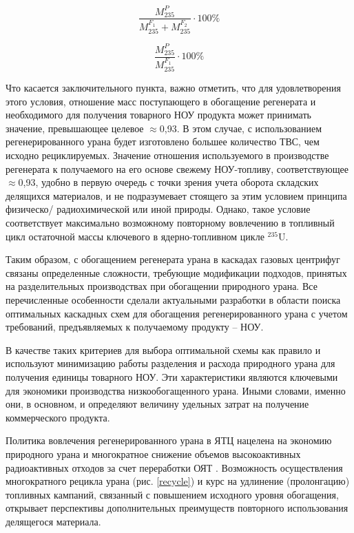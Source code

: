 \begin{equation}
  \label{Rec_rel}
  \frac{M_{235}^{P}}{M_{235}^{F_{1}}+M_{235}^{F_{2}}} \cdot 100 \%
\end{equation}

\begin{equation}
  \label{RecR_rel}
  \frac{M_{235}^{P}}{M_{235}^{F_{1}}} \cdot 100 \%
\end{equation}

Что касается заключительного пункта, важно отметить, что для удовлетворения этого условия, отношение масс поступающего в обогащение регенерата и необходимого для получения товарного НОУ продукта может принимать значение, превышающее целевое $\approx$0,93. В этом случае, с использованием регенерированного урана будет изготовлено большее количество ТВС, чем исходно рециклируемых. Значение отношения используемого в производстве регенерата к получаемого на его основе свежему НОУ-топливу, соответствующее $\approx$0,93, удобно в первую очередь с точки зрения учета оборота складских делящихся материалов, и не подразумевает стоящего за этим условием принципа физическо/ радиохимической или иной природы.  Однако, такое условие соответствует максимально возможному повторному вовлечению в топливный цикл остаточной массы ключевого в ядерно-топливном цикле $^{235}$U.

Таким образом, с обогащением регенерата урана в каскадах газовых центрифуг связаны определенные сложности, требующие модификации подходов, принятых на разделительных производствах при обогащении природного урана. Все перечисленные особенности сделали актуальными разработки в области поиска оптимальных каскадных схем для обогащения регенерированного урана с учетом требований, предъявляемых к получаемому продукту -- НОУ. 

В качестве таких критериев для выбора оптимальной схемы как правило и используют минимизацию работы разделения и расхода природного урана для получения единицы товарного НОУ. Эти характеристики являются ключевыми для экономики производства низкообогащенного урана. Иными словами, именно они, в основном, и определяют величину удельных затрат на получение коммерческого продукта.

Политика вовлечения регенерированного урана в ЯТЦ нацелена на экономию природного урана и многократное снижение объемов высокоактивных радиоактивных отходов за счет переработки ОЯТ \cite{delculAnalysisReuseUranium2009}. Возможность осуществления многократного рецикла урана (рис. \ref{recycle}) и курс на удлинение (пролонгацию) топливных кампаний, связанный с повышением исходного уровня обогащения, открывает перспективы дополнительных преимуществ повторного использования делящегося материала.

